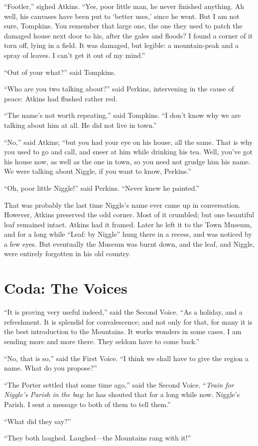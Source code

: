 “Footler,” sighed Atkins. “Yes, poor little man, he never finished anything. Ah well, his canvases have been put to ‘better uses,’ since he went. But I am not sure, Tompkins. You remember that large one, the one they used to patch the damaged house next door to his, after the gales and floods? I found a corner of it torn off, lying in a field. It was damaged, but legible: a mountain-peak and a spray of leaves. I can’t get it out of my mind.”

“Out of your what?” said Tompkins.

“Who are you two talking about?” said Perkins, intervening in the cause of peace: Atkins had flushed rather red.

“The name’s not worth repeating,” said Tompkins. “I don’t know why we are talking about him at all. He did not live in town.”

“No,” said Atkins; “but you had your eye on his house, all the same. That is why you used to go and call, and sneer at him while drinking his tea. Well, you’ve got his house now, as well as the one in town, so you need not grudge him his name. We were talking about Niggle, if you want to know, Perkins.”

“Oh, poor little Niggle!” said Perkins. “Never knew he painted.”

That was probably the last time Niggle’s name ever came up in conversation. However, Atkins preserved the odd corner. Most of it crumbled; but one beautiful leaf remained intact. Atkins had it framed. Later he left it to the Town Museum, and for a long while “Leaf: by Niggle” hung there in a recess, and was noticed by a few eyes. But eventually the Museum was burnt down, and the leaf, and Niggle, were entirely forgotten in his old country.

\onlyscore{\pagebreak}
\section*{Coda: The Voices}

“It is proving very useful indeed,” said the Second Voice. “As a holiday, and a refreshment. It is splendid for convalescence; and not only for that, for many it is the best introduction to the Mountains. It works wonders in some cases. I am sending more and more there. They seldom have to come back.”

“No, that is so,” said the First Voice. “I think we shall have to give the region a name. What do you propose?”

“The Porter settled that some time ago,” said the Second Voice. “\emph{Train for Niggle’s Parish in the bay}: he has shouted that for a long while now. Niggle’s Parish. I sent a message to both of them to tell them.”

“What did they say?”

“They both laughed. Laughed—the Mountains rang with it!”

\onlyscore{\bigskip\bigskip}

